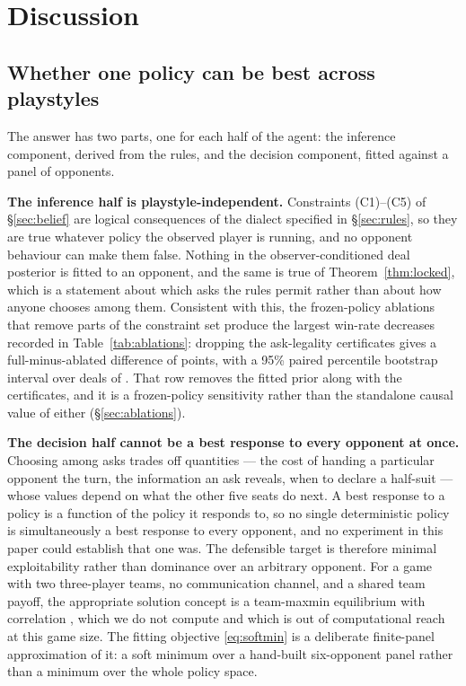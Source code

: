 \section{Discussion}
\label{sec:discussion}

\subsection{Whether one policy can be best across playstyles}

The answer has two parts, one for each half of the agent: the inference
component, derived from the rules, and the decision component, fitted against a
panel of opponents.

\textbf{The inference half is playstyle-independent.} Constraints (C1)--(C5) of
\S\ref{sec:belief} are logical consequences of the dialect specified in
\S\ref{sec:rules}, so they are true whatever policy the observed player is
running, and no opponent behaviour can make them false. Nothing in the
observer-conditioned deal posterior is fitted to an opponent, and the same is true
of Theorem~\ref{thm:locked}, which is a statement about which asks the rules
permit rather than about how anyone chooses among them. Consistent with this, the
frozen-policy ablations that remove parts of the constraint set produce the
largest win-rate decreases recorded in Table~\ref{tab:ablations}: dropping the
ask-legality certificates gives a full-minus-ablated difference of
\numAblSinkhorn{} points, with a 95\% paired percentile bootstrap interval over
deals of \numAblSinkhornCI{}. That row removes the fitted prior along with the
certificates, and it is a frozen-policy sensitivity rather than the standalone
causal value of either (\S\ref{sec:ablations}).

\textbf{The decision half cannot be a best response to every opponent at once.}
Choosing among asks trades off quantities --- the cost of handing a particular
opponent the turn, the information an ask reveals, when to declare a half-suit
--- whose values depend on what the other five seats do next. A best response to
a policy is a function of the policy it responds to, so no single deterministic
policy is simultaneously a best response to every opponent, and no experiment in
this paper could establish that one was. The defensible target is therefore
minimal exploitability rather than dominance over an arbitrary opponent. For a
game with two three-player teams, no communication channel, and a shared team
payoff, the appropriate solution concept is a team-maxmin equilibrium with
correlation \cite{celli-gatti,zhang-tbdag}, which we do not compute and which is
out of computational reach at this game size. The fitting objective
\eqref{eq:softmin} is a deliberate finite-panel approximation of it: a soft
minimum over a hand-built six-opponent panel rather than a minimum over the whole
policy space.

